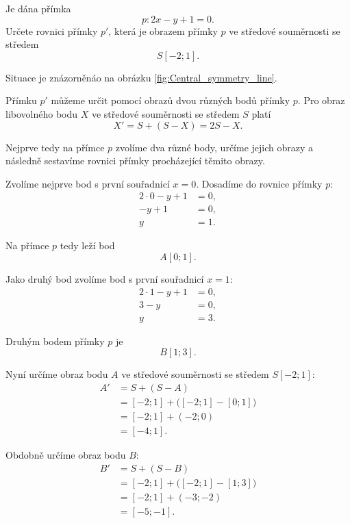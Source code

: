 \begin{example}\label{exa:Central_symmetry_line}
    Je dána přímka
    \[
        p:2x-y+1=0.
    \]
    Určete rovnici přímky $p'$, která je obrazem přímky $p$ ve
    středové souměrnosti se středem
    \[
        S[-2;1].
    \]

    Situace je znázorněnáo na obrázku \ref{fig:Central_symmetry_line}.
    
    Přímku $p'$ můžeme určit pomocí obrazů dvou různých bodů přímky
    $p$. Pro obraz libovolného bodu $X$ ve středové souměrnosti se
    středem $S$ platí
    \[
        X'=S+(S-X)=2S-X.
    \]

    Nejprve tedy na přímce $p$ zvolíme dva různé body, určíme jejich
    obrazy a následně sestavíme rovnici přímky procházející těmito
    obrazy.

    Zvolíme nejprve bod s první souřadnicí $x=0$. Dosadíme do rovnice
    přímky $p$:
    \begin{align*}
        2\cdot0-y+1&=0,\\
        -y+1&=0,\\
        y&=1.
    \end{align*}

    Na přímce $p$ tedy leží bod
    \[
        A[0;1].
    \]

    Jako druhý bod zvolíme bod s první souřadnicí $x=1$:
    \begin{align*}
        2\cdot1-y+1&=0,\\
        3-y&=0,\\
        y&=3.
    \end{align*}

    Druhým bodem přímky $p$ je
    \[
        B[1;3].
    \]

    Nyní určíme obraz bodu $A$ ve středové souměrnosti se středem
    $S[-2;1]$:
    \begin{align*}
        A'
        &=
        S+(S-A)\\
        &=
        [-2;1]+\bigl([-2;1]-[0;1]\bigr)\\
        &=
        [-2;1]+(-2;0)\\
        &=
        [-4;1].
    \end{align*}

    Obdobně určíme obraz bodu $B$:
    \begin{align*}
        B'
        &=
        S+(S-B)\\
        &=
        [-2;1]+\bigl([-2;1]-[1;3]\bigr)\\
        &=
        [-2;1]+(-3;-2)\\
        &=
        [-5;-1].
    \end{align*}


\end{example}

